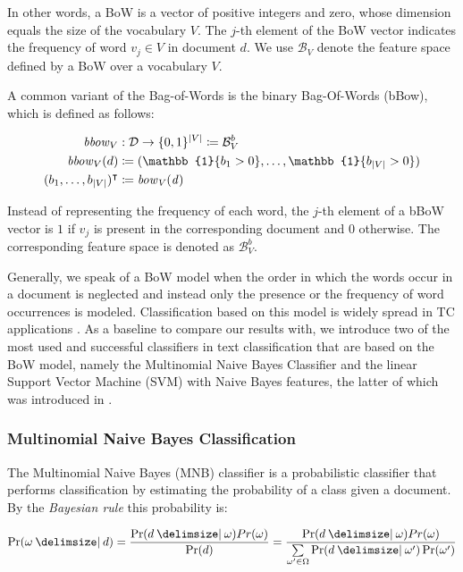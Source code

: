 In other words, a BoW is a vector of positive integers and zero, whose
dimension equals the size of the vocabulary $V$. The $j$-th element of the
BoW vector indicates the frequency of word $v_j \in V$ in document $d$. We use
$\mathcal{B}_V$ denote the feature space defined by a BoW over a vocabulary $V$.

A common variant of the Bag-of-Words is the binary Bag-Of-Words (bBow), which is
defined as follows:

\begin{equation*}
\begin{split}
 \mli{bbow}_V &: \mathcal{D} \to \{0,1\}^{|V|} \coloneqq \mathcal{B}_V^{b} \\
\mli{bbow}_V(d) &\coloneqq (\mathbb{1}\{b_1 > 0\},\ldots,\mathbb{1}\{b_{|V|} >
0\})\\
(b_1, \ldots, b_{|V|})^\intercal &\coloneqq \mli{bow_V(d)}
\end{split}
\end{equation*}

Instead of representing the frequency of each word, the $j$-th element of a bBoW
vector is $1$ if $v_j$ is present in the corresponding document and $0$
otherwise. The corresponding feature space is denoted as $\mathcal{B}_V^{b}$.

Generally, we speak of a BoW model when the order in which the words occur in a
document is neglected and instead only the presence or the frequency of word
occurrences is modeled. Classification based on this model is widely spread in
TC applications \cite{Joachims1998, mccallum1998comparison}. As a baseline to compare our results with, we
introduce two of the most used and successful classifiers in text classification that are based
on the BoW model, namely the Multinomial Naive Bayes Classifier \cite{Eyheramendy2003}
 and the linear Support Vector Machine (SVM) with Naive Bayes features,
the latter of which was introduced in \cite{wang2012baselines}.

\subsubsection{Multinomial Naive Bayes Classification} 
\label{sssec:mnb}
The Multinomial Naive Bayes (MNB) classifier is a probabilistic classifier that
performs classification by estimating the probability of a class given a document. 
By the \emph{Bayesian rule} this probability is:

\begin{equation}
\label{eq:nb-bayes-rule}
\Pr(\omega\given d) = \frac{\Pr(d\given\omega)Pr(\omega)}{\Pr(d)} =
\frac{\Pr(d\given\omega)Pr(\omega)}{\sum\limits_{\omega' \in \Omega} \Pr(d\given\omega') \Pr(\omega')}
\end{equation}

